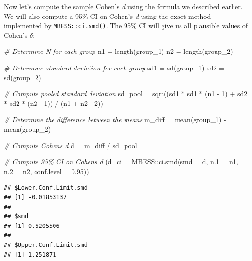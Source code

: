 \documentclass[
]{book}
\newenvironment{Shaded}{\begin{snugshade}}{\end{snugshade}}
\newcommand{\AttributeTok}[1]{\textcolor[rgb]{0.77,0.63,0.00}{#1}}
\newcommand{\CommentTok}[1]{\textcolor[rgb]{0.56,0.35,0.01}{\textit{#1}}}
\newcommand{\DecValTok}[1]{\textcolor[rgb]{0.00,0.00,0.81}{#1}}
\newcommand{\FloatTok}[1]{\textcolor[rgb]{0.00,0.00,0.81}{#1}}
\newcommand{\FunctionTok}[1]{\textcolor[rgb]{0.00,0.00,0.00}{#1}}
\newcommand{\NormalTok}[1]{#1}
\newcommand{\OtherTok}[1]{\textcolor[rgb]{0.56,0.35,0.01}{#1}}
\newcommand{\SpecialCharTok}[1]{\textcolor[rgb]{0.00,0.00,0.00}{#1}}
\begin{document}
Now let's compute the sample Cohen's \emph{d} using the formula we described earlier. We will also compute a 95\% CI on Cohen's \emph{d} using the exact method implemented by \texttt{MBESS::ci.smd()}. The 95\% CI will give us all plausible values of Cohen's \(\delta\):

\begin{Shaded}
\begin{Highlighting}[]
\CommentTok{\# Determine N for each group}
\NormalTok{n1 }\OtherTok{=} \FunctionTok{length}\NormalTok{(group\_1)}
\NormalTok{n2 }\OtherTok{=} \FunctionTok{length}\NormalTok{(group\_2)}

\CommentTok{\# Determine standard deviation for each group}
\NormalTok{sd1 }\OtherTok{=} \FunctionTok{sd}\NormalTok{(group\_1)}
\NormalTok{sd2 }\OtherTok{=} \FunctionTok{sd}\NormalTok{(group\_2)}

\CommentTok{\# Compute pooled standard deviation}
\NormalTok{sd\_pool }\OtherTok{=} \FunctionTok{sqrt}\NormalTok{((sd1 }\SpecialCharTok{*}\NormalTok{ sd1 }\SpecialCharTok{*}\NormalTok{ (n1 }\SpecialCharTok{{-}} \DecValTok{1}\NormalTok{) }\SpecialCharTok{+}\NormalTok{ sd2 }\SpecialCharTok{*}\NormalTok{ sd2 }\SpecialCharTok{*}\NormalTok{ (n2 }\SpecialCharTok{{-}} \DecValTok{1}\NormalTok{)) }\SpecialCharTok{/}\NormalTok{ (n1 }\SpecialCharTok{+}\NormalTok{ n2 }\SpecialCharTok{{-}} \DecValTok{2}\NormalTok{))}

\CommentTok{\# Determine the difference between the means}
\NormalTok{m\_diff }\OtherTok{=} \FunctionTok{mean}\NormalTok{(group\_1) }\SpecialCharTok{{-}} \FunctionTok{mean}\NormalTok{(group\_2)}

\CommentTok{\# Compute Cohen\textquotesingle{}s d}
\NormalTok{d }\OtherTok{=}\NormalTok{ m\_diff }\SpecialCharTok{/}\NormalTok{ sd\_pool}

\CommentTok{\# Compute 95\% CI on Cohen\textquotesingle{}s d}
\NormalTok{(}\AttributeTok{d\_ci =}\NormalTok{ MBESS}\SpecialCharTok{::}\FunctionTok{ci.smd}\NormalTok{(}\AttributeTok{smd =}\NormalTok{ d, }\AttributeTok{n.1 =}\NormalTok{ n1, }\AttributeTok{n.2 =}\NormalTok{ n2, }\AttributeTok{conf.level =} \FloatTok{0.95}\NormalTok{))}
\end{Highlighting}
\end{Shaded}

\begin{verbatim}
## $Lower.Conf.Limit.smd
## [1] -0.01853137
## 
## $smd
## [1] 0.6205506
## 
## $Upper.Conf.Limit.smd
## [1] 1.251871
\end{verbatim}
\end{document}
